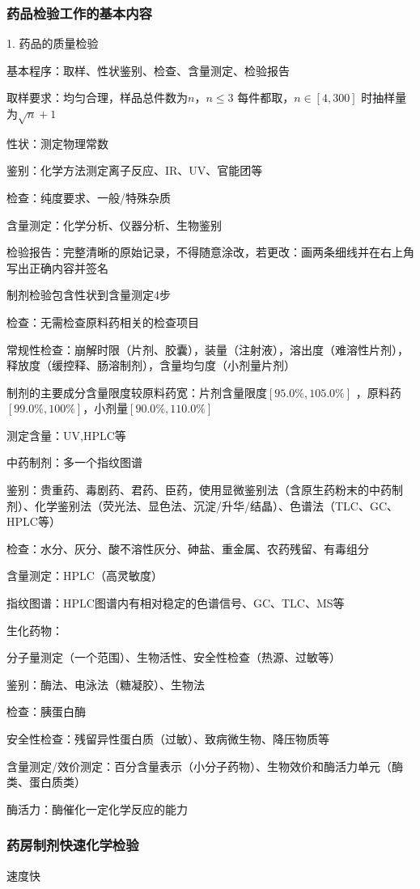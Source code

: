 \subsubsection{药品检验工作的基本内容}%
\label{subsub:药品检验工作的基本内容}
1. 药品的质量检验
\begin{notation}
    基本程序：取样、性状鉴别、检查、含量测定、检验报告

    取样要求：均匀合理，样品总件数为$n$，$n\le 3$ 每件都取，$n\in [4,300]$ 时抽样量为$\sqrt{n}+1 $

    性状：测定物理常数

    鉴别：化学方法测定离子反应、IR、UV、官能团等

    检查：纯度要求、一般/特殊杂质
    
    含量测定：化学分析、仪器分析、生物鉴别

    检验报告：完整清晰的原始记录，不得随意涂改，若更改：画两条细线并在右上角写出正确内容并签名
\end{notation}
\begin{notation}
    制剂检验包含性状到含量测定4步

    检查：无需检查原料药相关的检查项目

    常规性检查：崩解时限（片剂、胶囊），装量（注射液），溶出度（难溶性片剂），释放度（缓控释、肠溶制剂），含量均匀度（小剂量片剂）

    制剂的主要成分含量限度较原料药宽：片剂含量限度$[95.0\%,105.0\%]$ ，原料药$[99.0\%,100\%]$，小剂量$[90.0\%,110.0\%]$ 

    测定含量：UV,HPLC等
\end{notation}
\begin{notation}
    中药制剂：多一个指纹图谱

    鉴别：贵重药、毒剧药、君药、臣药，使用显微鉴别法（含原生药粉末的中药制剂）、化学鉴别法（荧光法、显色法、沉淀/升华/结晶）、色谱法（TLC、GC、HPLC等）

    检查：水分、灰分、酸不溶性灰分、砷盐、重金属、农药残留、有毒组分

    含量测定：HPLC（高灵敏度）

    指纹图谱：HPLC图谱内有相对稳定的色谱信号、GC、TLC、MS等
\end{notation}
\begin{notation}
    生化药物：

    分子量测定（一个范围）、生物活性、安全性检查（热源、过敏等）

    鉴别：酶法、电泳法（糖凝胶）、生物法

    检查：胰蛋白酶

    安全性检查：残留异性蛋白质（过敏）、致病微生物、降压物质等

    含量测定/效价测定：百分含量表示（小分子药物）、生物效价和酶活力单元（酶类、蛋白质类）

    酶活力：酶催化一定化学反应的能力
\end{notation}
\subsubsection{药房制剂快速化学检验}%
\label{subsub:药房制剂快速化学检验}
速度快


    


